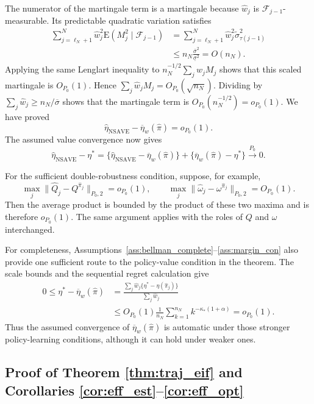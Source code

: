 \documentclass[12pt]{article}
\theoremstyle{remark}\newtheorem{remark}[theorem]{Remark}\theoremstyle{plain}
\newcommand{\E}{\mathrm{E}}
\begin{document}
The numerator of the martingale term is a martingale because
$\widehat w_j$ is $\mathcal F_{j-1}$-measurable.  Its predictable
quadratic variation satisfies
\[
    \begin{aligned}
    \sum_{j=\ell_N+1}^N
    \widehat w_j^2
    \E(M_j^2\mid\mathcal F_{j-1})
    &=
    \sum_{j=\ell_N+1}^N
    \widehat w_j^2
    \widetilde\sigma_{\tau(j-1)}^2\\
    &\leq
    n_N\frac{\overline\sigma^2}{\underline\sigma^2}
    =O(n_N).
    \end{aligned}
\]
Applying the same Lenglart inequality to
$n_N^{-1/2}\sum_j\widehat w_jM_j$ shows that this scaled martingale is
$O_{P_0}(1)$.  Hence
$\sum_j\widehat w_jM_j=O_{P_0}(\sqrt{n_N})$.
Dividing by
$\sum_j\widehat w_j\geq n_N/\overline\sigma$ shows that the
martingale term is $O_{P_0}(n_N^{-1/2})=o_{P_0}(1)$.
We have proved
\[
    \widehat\eta_{\mathrm{NSAVE}}
    -\overline\eta_w(\widehat\pi)=o_{P_0}(1).
\]
The assumed value convergence now gives
\[
    \widehat\eta_{\mathrm{NSAVE}}-\eta^*
    =
    \{\widehat\eta_{\mathrm{NSAVE}}
      -\overline\eta_w(\widehat\pi)\}
    +\{\overline\eta_w(\widehat\pi)-\eta^*\}
    \overset{P_0}{\to}0.
\]

For the sufficient double-robustness condition, suppose, for example,
\[
    \max_j\|\widehat Q_j-Q^{\widehat\pi_j}\|_{P_0,2}
    =o_{P_0}(1),
    \qquad
    \max_j\|\widehat\omega_j-\omega^{\widehat\pi_j}\|_{P_0,2}
    =O_{P_0}(1).
\]
Then the average product is bounded by the product of these two
maxima and is therefore $o_{P_0}(1)$.  The same argument applies with
the roles of $Q$ and $\omega$ interchanged.

For completeness, Assumptions~\ref{ass:bellman_complete}--\ref{ass:margin_con}
also provide one sufficient route to the policy-value condition in
the theorem.  The scale bounds and the sequential regret calculation
give
\[
    \begin{aligned}
    0\leq
    \eta^*-\overline\eta_w(\widehat\pi)
    &=
    \frac{\sum_j\widehat w_j
    \{\eta^*-\eta(\widehat\pi_j)\}}
    {\sum_j\widehat w_j}\\
    &\leq
    O_{P_0}(1)\frac1{n_N}
    \sum_{k=1}^{n_N}k^{-\kappa_*(1+\alpha)}
    =o_{P_0}(1).
    \end{aligned}
\]
Thus the assumed convergence of
$\overline\eta_w(\widehat\pi)$ is automatic under those stronger
policy-learning conditions, although it can hold under weaker ones.

\subsection{Proof of Theorem \ref{thm:traj_eif} and
Corollaries \ref{cor:eff_est}--\ref{cor:eff_opt}}
\label{sec:traj_eff_proofs}
\end{document}
